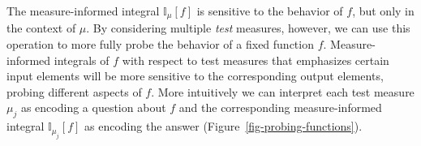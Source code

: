 \documentclass[
  letterpaper,
  DIV=11,
  numbers=noendperiod]{scrartcl}
\begin{document}
The measure-informed integral \(\mathbb{I}_{\mu}[f]\) is sensitive to
the behavior of \(f\), but only in the context of \(\mu\). By
considering multiple \emph{test} measures, however, we can use this
operation to more fully probe the behavior of a fixed function \(f\).
Measure-informed integrals of \(f\) with respect to test measures that
emphasizes certain input elements will be more sensitive to the
corresponding output elements, probing different aspects of \(f\). More
intuitively we can interpret each test measure \(\mu_{j}\) as encoding a
question about \(f\) and the corresponding measure-informed integral
\(\mathbb{I}_{\mu_{j}}[f]\) as encoding the answer
(Figure~\ref{fig-probing-functions}).

\begin{figure}

\begin{minipage}[t]{0.05\linewidth}

{\centering 

~

}

\end{minipage}%
%
\begin{minipage}[t]{0.45\linewidth}

{\centering 


}

\subcaption{\label{fig-probing-functions}}
\end{minipage}%
%
\begin{minipage}[t]{0.45\linewidth}


\end{minipage}
\end{figure}
\end{document}
